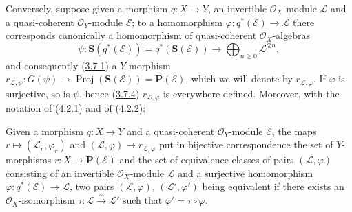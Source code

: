 \begin{env}[4.2.2]
\label{II.4.2.2}
Conversely, suppose given a morphism $q:X\to Y$, an invertible
$\mathcal{O}_X$-module $\mathcal{L}$ and a quasi-coherent
$\mathcal{O}_Y$-module $\mathcal{E}$; to a homomorphism
$\varphi:q^*(\mathcal{E})\to\mathcal{L}$ there corresponds canonically a
homomorphism of quasi-coherent $\mathcal{O}_X$-algebras
\[
  \psi:\mathbf{S}(q^*(\mathcal{E}))=q^*(\mathbf{S}(\mathcal{E}))
  \longrightarrow\bigoplus_{n\geq0}\mathcal{L}^{\otimes n},
\]
and consequently (\hyperref[II.3.7.1]{3.7.1}) a $Y$-morphism
$r_{\mathcal{L},\psi}:G(\psi)\to
\operatorname{Proj}(\mathbf{S}(\mathcal{E}))=\mathbf{P}(\mathcal{E})$, which
we will denote by $r_{\mathcal{L},\varphi}$. If $\varphi$ is surjective, so
is $\psi$, hence (\hyperref[II.3.7.4]{3.7.4})
$r_{\mathcal{L},\varphi}$ is everywhere defined. Moreover, with the notation of
(\hyperref[II.4.2.1]{4.2.1}) and of (4.2.2):
\end{env}

\begin{proposition}[4.2.3]
\label{II.4.2.3}
Given a morphism $q:X\to Y$ and a quasi-coherent $\mathcal{O}_Y$-module
$\mathcal{E}$, the maps
$r\mapsto(\mathcal{L}_r,\varphi_r)$ and
$(\mathcal{L},\varphi)\mapsto r_{\mathcal{L},\varphi}$ put in
bijective correspondence the set of $Y$-morphisms
$r:X\to\mathbf{P}(\mathcal{E})$ and the set of equivalence classes of
pairs $(\mathcal{L},\varphi)$ consisting of an invertible $\mathcal{O}_X$-module
$\mathcal{L}$ and a surjective homomorphism
$\varphi:q^*(\mathcal{E})\to\mathcal{L}$, two pairs
$(\mathcal{L},\varphi)$, $(\mathcal{L}',\varphi')$ being equivalent if there
exists an $\mathcal{O}_X$-isomorphism
$\tau:\mathcal{L}\xrightarrow{\sim}\mathcal{L}'$ such that
$\varphi'=\tau\circ\varphi$.
\end{proposition}

